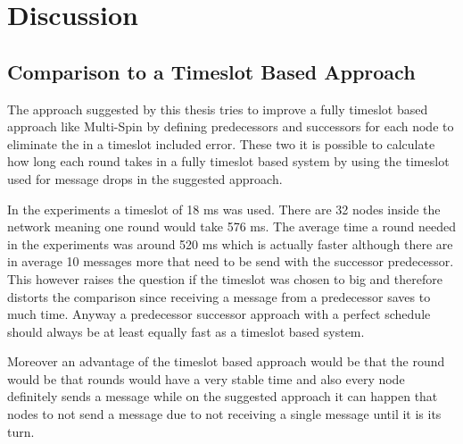 \chapter{Discussion}



\section{Comparison to a Timeslot Based Approach}
The approach suggested by this thesis tries to improve a fully timeslot based approach like Multi-Spin by defining predecessors and successors for each node to eliminate the in a timeslot included error. 
These two it is possible to calculate how long each round takes in a fully timeslot based system by using the timeslot used for message drops in the suggested approach. 

In the experiments a timeslot of 18 ms was used. There are 32 nodes inside the network meaning one round would take 576 ms. The average time a round needed in the experiments was around 520 ms which is actually faster although there are in average 10 messages more that need to be send with the successor predecessor. This however raises the question if the timeslot was chosen to big and therefore distorts the comparison since receiving a message from a predecessor saves to much time. Anyway a predecessor successor approach with a perfect schedule should always be at least equally fast as a timeslot based system. 

Moreover an advantage of the timeslot based approach would be that the round would be that rounds would have a very stable time and also every node definitely sends a message while on the suggested approach it can happen that nodes to not send a message due to not receiving a single message until it is its turn.

